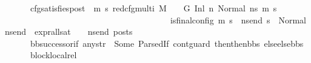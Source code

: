 \begin{isabellebody}
\ \ \ \ \ \ \ cfg{\isacharunderscore}{\kern0pt}satisfies{\isacharunderscore}{\kern0pt}post{\isacharcolon}{\kern0pt}\ {\isachardoublequoteopen}{\isacharparenleft}{\kern0pt}{\isasymAnd}\ m{}\ s{}{\isachardot}{\kern0pt}\ {\isacharparenleft}{\kern0pt}red{\isacharunderscore}{\kern0pt}cfg{\isacharunderscore}{\kern0pt}multi\ M\ {\isasymLambda}\ {\isasymGamma}\ {\isasymOmega}\ G\ {\isacharparenleft}{\kern0pt}Inl\ n{\isacharcomma}{\kern0pt}\ Normal\ ns{}{\isacharparenright}{\kern0pt}\ {\isacharparenleft}{\kern0pt}m{}{\isacharcomma}{\kern0pt}\ s{}{\isacharparenright}{\kern0pt}{\isacharparenright}{\kern0pt}\ {\isasymLongrightarrow}\isanewline
\ \ \ \ \ \ \ \ \ \ \ \ \ \ \ \ \ \ \ \ \ \ \ \ \ \ \ \ \ \ \ \ \ \ \ \ \ \ \ \ is{\isacharunderscore}{\kern0pt}final{\isacharunderscore}{\kern0pt}config\ {\isacharparenleft}{\kern0pt}m{}{\isacharcomma}{\kern0pt}\ s{}{\isacharparenright}{\kern0pt}\ {\isasymLongrightarrow}\ {\isasymforall}ns{\isacharunderscore}{\kern0pt}end{\isachardot}{\kern0pt}\ s{}\ {\isacharequal}{\kern0pt}\ Normal\ ns{\isacharunderscore}{\kern0pt}end\ {\isasymlongrightarrow}\ {\isacharparenleft}{\kern0pt}expr{\isacharunderscore}{\kern0pt}all{\isacharunderscore}{\kern0pt}sat\ {\isasymLambda}\ {\isasymGamma}\ {\isasymOmega}\ ns{\isacharunderscore}{\kern0pt}end{\isacharparenright}{\kern0pt}\ posts{\isacharparenright}{\kern0pt}{\isachardoublequoteclose}\isanewline
\ \ \ \ \ \ \ bb{\isacharunderscore}{\kern0pt}successor{\isacharunderscore}{\kern0pt}if{\isacharcolon}{\kern0pt}\ {\isachardoublequoteopen}any{\isacharunderscore}{\kern0pt}str\ {\isacharequal}{\kern0pt}\ Some\ {\isacharparenleft}{\kern0pt}ParsedIf\ cont{\isacharunderscore}{\kern0pt}guard\ {\isacharparenleft}{\kern0pt}then{}{\isacharhash}{\kern0pt}then{\isacharunderscore}{\kern0pt}bbs{\isacharparenright}{\kern0pt}\ {\isacharparenleft}{\kern0pt}else{}{\isacharhash}{\kern0pt}else{\isacharunderscore}{\kern0pt}bbs{\isacharparenright}{\kern0pt}{\isacharparenright}{\kern0pt}{\isachardoublequoteclose}\isanewline
\ \ \ \ \ \ \ block{\isacharunderscore}{\kern0pt}local{\isacharunderscore}{\kern0pt}rel{\isacharcolon}{\kern0pt}\isanewline

\end{isabellebody}
